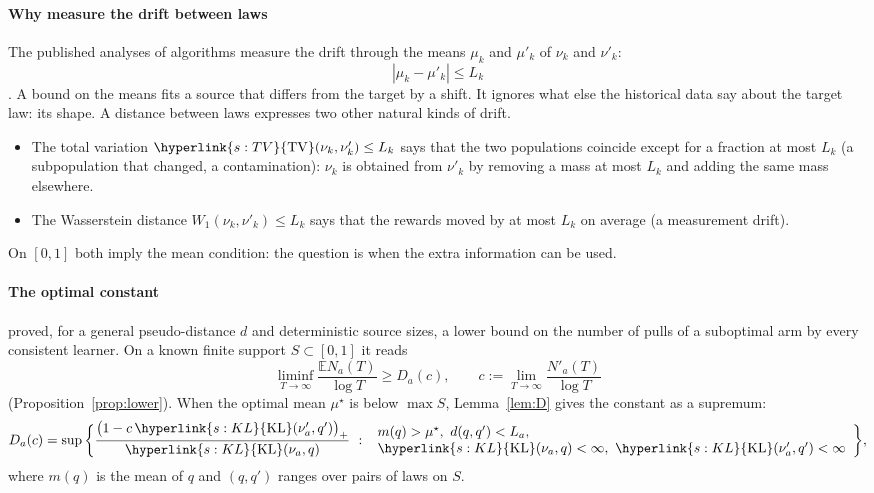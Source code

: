 \documentclass[11pt]{article}
\newcommand{\E}{\mathbb{E}}
\newcommand{\sy}[2]{{\hyperlink{#1}{#2}}}
\newcommand{\KL}{\sy{s:KL}{\mathrm{KL}}}
\newcommand{\TV}{\sy{s:TV}{\mathrm{TV}}}
\begin{document}
\paragraph{Why measure the drift between laws} The published analyses of algorithms measure the
drift through the means $\mu_k$ and $\mu'_k$ of $\nu_k$ and $\nu'_k$:
\begin{equation*}
|\mu_k-\mu'_k|\le L_k
\end{equation*}
\citep{PMM25,PMRM26}. A bound on the means fits a source that differs from the target by a shift.
It ignores what else the historical data say about the target law: its shape. A distance between
laws expresses two other natural kinds of drift.
\begin{itemize}
\item The total variation $\TV(\nu_k,\nu'_k)\le L_k$ says that the two populations coincide except
  for a fraction at most $L_k$ (a subpopulation that changed, a contamination): $\nu_k$ is obtained
  from $\nu'_k$ by removing a mass at most $L_k$ and adding the same mass elsewhere.
\item The Wasserstein distance $W_1(\nu_k,\nu'_k)\le L_k$ says that the rewards moved by at most
  $L_k$ on average (a measurement drift).
\end{itemize}
On $[0,1]$ both imply the mean condition: the question is when the extra information can be used.

\paragraph{The optimal constant} \citet[Theorem~3]{PMM25} proved, for a general pseudo-distance $d$
and deterministic source sizes, a lower bound on the number of pulls of a suboptimal arm by every
consistent learner. On a known finite support $S\subset[0,1]$ it reads
\begin{equation*}
\liminf_{T\to\infty}\frac{\E N_a(T)}{\log T}\ge D_a(c),\qquad c:=\lim_{T\to\infty}\frac{N'_a(T)}{\log T}
\end{equation*}
(Proposition~\ref{prop:lower}). When the optimal mean $\mu^\star$ is below $\max S$,
Lemma~\ref{lem:D} gives the constant as a supremum:
\begin{equation}\label{eq:sup-form}
D_a(c)=\sup\bigg\{\frac{\big(1-c\,\KL(\nu'_a,q')\big)_+}{\KL(\nu_a,q)}\ :\
\begin{array}{l}m(q)>\mu^\star,\ d(q,q')<L_a,\\ \KL(\nu_a,q)<\infty,\ \KL(\nu'_a,q')<\infty\end{array}\bigg\},
\end{equation}
where $m(q)$ is the mean of $q$ and $(q,q')$ ranges over pairs of laws on $S$.
\end{document}
